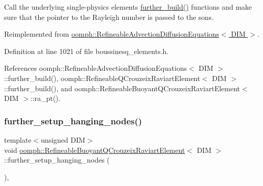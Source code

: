 Call the underlying single-\/physics element\textquotesingle{}s \hyperlink{classoomph_1_1RefineableBuoyantQCrouzeixRaviartElement_a60d622f02595901b5f3ad830de915471}{further\+\_\+build()} functions and make sure that the pointer to the Rayleigh number is passed to the sons. 



Reimplemented from \hyperlink{classoomph_1_1RefineableAdvectionDiffusionEquations_a093f39b8be3671828b7018b1f6103c68}{oomph\+::\+Refineable\+Advection\+Diffusion\+Equations$<$ D\+I\+M $>$}.



Definition at line 1021 of file boussinesq\+\_\+elements.\+h.



References oomph\+::\+Refineable\+Advection\+Diffusion\+Equations$<$ D\+I\+M $>$\+::further\+\_\+build(), oomph\+::\+Refineable\+Q\+Crouzeix\+Raviart\+Element$<$ D\+I\+M $>$\+::further\+\_\+build(), and oomph\+::\+Refineable\+Buoyant\+Q\+Crouzeix\+Raviart\+Element$<$ D\+I\+M $>$\+::ra\+\_\+pt().

\mbox{\label{classoomph_1_1RefineableBuoyantQCrouzeixRaviartElement_ab0a823598e014557e7d2ef2d533972d1}} 
\subsubsection{\texorpdfstring{further\+\_\+setup\+\_\+hanging\+\_\+nodes()}{further\_setup\_hanging\_nodes()}}
{\footnotesize\ttfamily template$<$unsigned D\+IM$>$ \\
void \hyperlink{classoomph_1_1RefineableBuoyantQCrouzeixRaviartElement}{oomph\+::\+Refineable\+Buoyant\+Q\+Crouzeix\+Raviart\+Element}$<$ D\+IM $>$\+::further\+\_\+setup\+\_\+hanging\+\_\+nodes (\begin{DoxyParamCaption}{ }\end{DoxyParamCaption})\hspace{0.3cm}{\ttfamily [inline]}, {\ttfamily [virtual]}}



